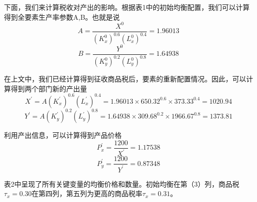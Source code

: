 \documentclass[cn,12pt,math=newtx,citestyle=gb7714-2015,bibstyle=gb7714-2015]{elegantbook}
\begin{document}
	下面，我们来计算税收对产出的影响。根据表1中的初始均衡配置，我们可以计算得到全要素生产率参数A,B。也就是说
	$$A=\frac{X^0}{(K_x^0)^{0.6}(L_x^0)^{0.4}}=1.96013$$
	$$B=\frac{Y^0}{(K_y^0)^{0.2}(L_y^0)^{0.8}}=1.64938$$
	
	在上文中，我们已经计算得到征收商品税后，要素的重新配置情况。因此，可以计算得到两个部门新的产出量
	$$X^{'}=A(K_x^{'})^{0.6}(L_x^{'})^{0.4}=1.96013\times 650.32^{0.6}\times 373.33^{0.4}=1020.94$$
	$$Y^{'}=A(K_y^{'})^{0.2}(L_y^{'})^{0.8}=1.64938\times 309.68^{0.2}\times 1966.67^{0.8}=1373.81$$
	
	利用产出信息，可以计算得到产品价格
	$$P_x^{'}=\frac{1200}{X^{'}}=1.17538$$
	$$P_y^{'}=\frac{1200}{Y^{'}}=0.87348$$
	
	表2中呈现了所有关键变量的均衡价格和数量。初始均衡在第（3）列，商品税$\tau_x=0.30$在第四列，第五列为更高的商品税率$\tau_x=0.31$。
	
\end{document}
